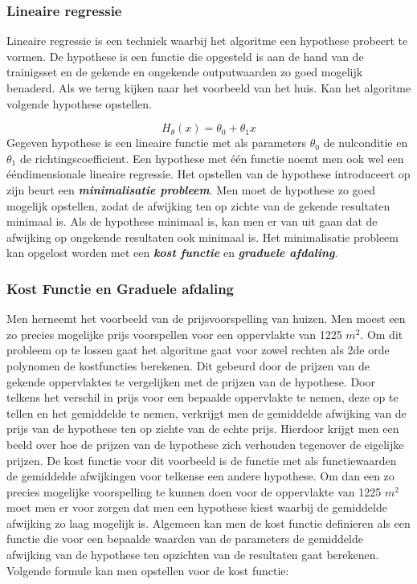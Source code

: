 \subsubsection{Lineaire regressie}\label{lineaire regressie}

Lineaire regressie is een techniek waarbij het algoritme een hypothese probeert te vormen. De hypothese is een functie die opgesteld is aan de hand van de trainigsset en de gekende en ongekende outputwaarden zo goed mogelijk benaderd.
\newline
Als we terug kijken naar het voorbeeld van het huis. Kan het algoritme volgende hypothese opstellen.

\[H_{\theta}(x) = \theta_{0} + \theta_{1}x \]
Gegeven hypothese is een lineaire functie met als parameters $\theta_{0}$ de nulconditie en $\theta_{1}$ de richtingscoefficient. Een hypothese met \'e\'en functie noemt men ook wel een \'e\'endimensionale lineaire regressie.
\newline
Het opstellen van de hypothese introduceert op zijn beurt een \textbf{\textit{minimalisatie probleem}}. Men moet de hypothese zo goed mogelijk opstellen, zodat de afwijking ten op zichte van de gekende resultaten minimaal is. Als de hypothese minimaal is, kan men er van uit gaan dat de afwijking op ongekende resultaten ook minimaal is.
\newline
Het minimalisatie probleem kan opgelost worden met een \textbf{\textit{kost functie}} en \textbf{\textit{graduele afdaling}}.

\subsubsection{Kost Functie en Graduele afdaling}\label{Kost Functie en Gradule afdaling}

Men herneemt het voorbeeld van de prijsvoorspelling van huizen. Men moest een zo precies mogelijke prijs voorspellen voor een oppervlakte van 1225 $m^2$. Om dit probleem op te lossen gaat het algoritme gaat voor zowel rechten als 2de orde polynomen de kostfuncties berekenen. Dit gebeurd door de prijzen van de gekende oppervlaktes te vergelijken met de prijzen van de hypothese. Door telkens het verschil in prijs voor een bepaalde oppervlakte te nemen, deze op te tellen en het gemiddelde te nemen, verkrijgt men de gemiddelde afwijking van de prijs van de hypothese ten op zichte van de echte prijs. Hierdoor krijgt men een beeld over hoe de prijzen van de hypothese zich verhouden tegenover de eigelijke prijzen. De kost functie voor dit voorbeeld is  de functie met als functiewaarden de gemiddelde afwijkingen voor telkense een andere hypothese. Om dan een zo precies mogelijke voorspelling te kunnen doen voor de oppervlakte van 1225 $m^2$ moet men er voor zorgen dat men een hypothese kiest waarbij de gemiddelde afwijking zo laag mogelijk is.
\newline
Algemeen kan men de kost functie definieren als  een functie die voor een bepaalde waarden van de parameters de gemiddelde afwijking van de hypothese ten opzichten van de resultaten gaat berekenen.
\newline
Volgende formule kan men opstellen voor de kost functie:

